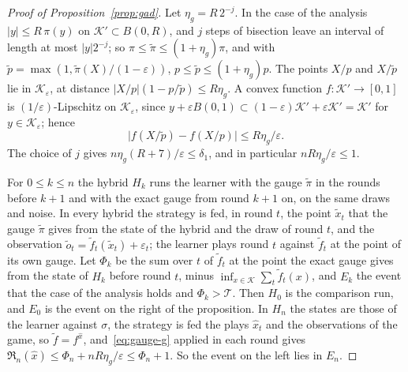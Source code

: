 \documentclass[11pt]{amsart}
\theoremstyle{definition}
\numberwithin{equation}{section}
\newcommand{\cK}{\mathcal{K}}
\newcommand{\Reg}{\mathfrak{R}}
\begin{document}
\begin{proof}[Proof of Proposition~\ref{prop:gad}]
Let $\eta_g=R\,2^{-j}$. In the case of the analysis $|y|\le R\,\pi(y)$ on $\cK'\subset B(0,R)$, and $j$ steps of bisection leave an interval of length at most $|y|2^{-j}$; so $\pi\le\tilde\pi\le(1+\eta_g)\pi$, and with $\tilde p=\max(1,\tilde\pi(X)/(1-\varepsilon))$, $p\le\tilde p\le(1+\eta_g)p$. The points $X/p$ and $X/\tilde p$ lie in $\cK_\varepsilon$, at distance $|X/p|(1-p/\tilde p)\le R\eta_g$. A convex function $f:\cK'\to[0,1]$ is $(1/\varepsilon)$-Lipschitz on $\cK_\varepsilon$, since $y+\varepsilon B(0,1)\subset(1-\varepsilon)\cK'+\varepsilon\cK'=\cK'$ for $y\in\cK_\varepsilon$; hence
\begin{equation}\label{eq:gauge-g}
\bigl|f(X/\tilde p)-f(X/p)\bigr|\le R\eta_g/\varepsilon .
\end{equation}
The choice of $j$ gives $n\eta_g(R+7)/\varepsilon\le\delta_1$, and in particular $nR\eta_g/\varepsilon\le1$.

For $0\le k\le n$ the hybrid $H_k$ runs the learner with the gauge $\tilde\pi$ in the rounds before $k+1$ and with the exact gauge from round $k+1$ on, on the same draws and noise. In every hybrid the strategy is fed, in round $t$, the point $\tilde x_t$ that the gauge $\tilde\pi$ gives from the state of the hybrid and the draw of round $t$, and the observation $\tilde o_t=\tilde f_t(\tilde x_t)+\varepsilon_t$; the learner plays round $t$ against $\tilde f_t$ at the point of its own gauge. Let $\Phi_k$ be the sum over $t$ of $\tilde f_t$ at the point the exact gauge gives from the state of $H_k$ before round $t$, minus $\inf_{x\in\cK}\sum_t\tilde f_t(x)$, and $E_k$ the event that the case of the analysis holds and $\Phi_k>\mathcal T$. Then $H_0$ is the comparison run, and $E_0$ is the event on the right of the proposition. In $H_n$ the states are those of the learner against $\sigma$, the strategy is fed the plays $\hat x_t$ and the observations of the game, so $\tilde f=f^{\hat x}$, and~\eqref{eq:gauge-g} applied in each round gives $\Reg_n(\hat x)\le\Phi_n+nR\eta_g/\varepsilon\le\Phi_n+1$. So the event on the left lies in $E_n$.


\end{proof}
\end{document}
